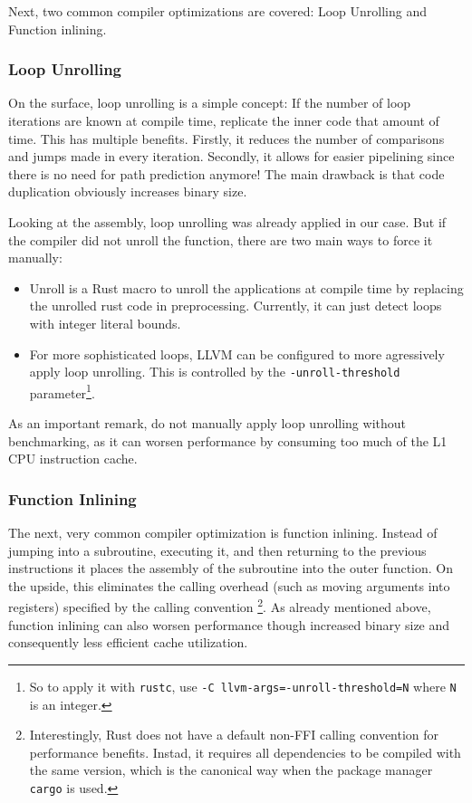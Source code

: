 Next, two common compiler optimizations are covered: Loop Unrolling and Function inlining.

\subsubsection{Loop Unrolling}

On the surface, loop unrolling is a simple concept: If the number of loop iterations are known at compile time, replicate the inner code that amount of time. This has multiple benefits. Firstly, it reduces the number of comparisons and jumps made in every iteration. Secondly, it allows for easier pipelining since there is no need for path prediction anymore! The main drawback is that code duplication obviously increases binary size.

Looking at the assembly, loop unrolling was already applied in our case. But if the compiler did not unroll the function, there are two main ways to force it manually:
\begin{itemize}
  \item Unroll \cite{unroll} is a Rust macro to unroll the applications at compile time by replacing the unrolled rust code in preprocessing. Currently, it can just detect loops with integer literal bounds.
  \item For more sophisticated loops, LLVM can be configured to more agressively apply loop unrolling. This is controlled by the \texttt{-unroll-threshold} parameter\footnote{So to apply it with \texttt{rustc}, use \texttt{-C llvm-args=-unroll-threshold=N} where \texttt{N} is an integer.}.
\end{itemize}
As an important remark, do not manually apply loop unrolling without benchmarking, as it can worsen performance by consuming too much of the L1 CPU instruction cache.

\subsubsection{Function Inlining}

The next, very common compiler optimization is function inlining. Instead of jumping into a subroutine, executing it, and then returning to the previous instructions it places the assembly of the subroutine into the outer function. On the upside, this eliminates the calling overhead (such as moving arguments into registers) specified by the calling convention \footnote{Interestingly, Rust does not have a default non-FFI calling convention for performance benefits. Instad, it requires all dependencies to be compiled with the same version, which is the canonical way when the package manager \texttt{cargo} is used.}. As already mentioned above, function inlining can also worsen performance though increased binary size and consequently less efficient cache utilization.


